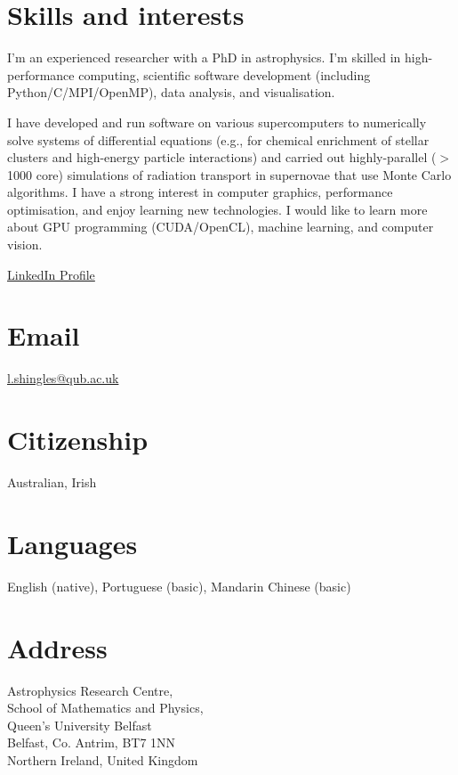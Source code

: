 \documentclass[11pt]{res} %
\begin{document}

\begin{resume}

\section{Skills and interests}
  I'm an experienced researcher with a PhD in astrophysics. I'm skilled in high-performance computing, scientific software development (including Python/C/MPI/OpenMP), data analysis, and visualisation.

  I have developed and run software on various supercomputers to numerically solve systems of differential equations (e.g., for chemical enrichment of stellar clusters and high-energy particle interactions) and carried out highly-parallel ($>$1000 core) simulations of radiation transport in supernovae that use Monte Carlo algorithms. I have a strong interest in computer graphics, performance optimisation, and enjoy learning new technologies. I would like to learn more about GPU programming (CUDA/OpenCL), machine learning, and computer vision.

  \href{https://www.linkedin.com/in/lukeshingles/}{LinkedIn Profile}

\section{Email}
  \href{mailto:l.shingles@qub.ac.uk}{l.shingles@qub.ac.uk}

\section{Citizenship}
  Australian, Irish

\section{Languages}
  English (native), Portuguese (basic), Mandarin Chinese (basic)

\section{Address}
  Astrophysics Research Centre,\\
  School of Mathematics and Physics,\\
  Queen's University Belfast\\
  Belfast, Co. Antrim, BT7 1NN\\
  Northern Ireland, United Kingdom


\end{resume}
\end{document}
